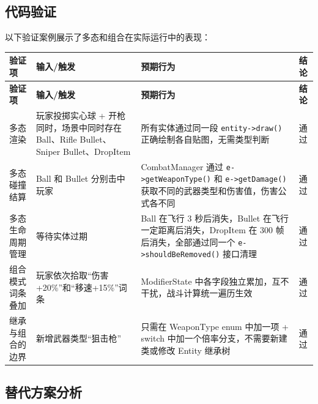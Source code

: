 \documentclass[utf8]{ctexart}
\begin{document}
\subsection{代码验证}

以下验证案例展示了多态和组合在实际运行中的表现：

\begin{longtable}{p{}p{}p{}p{}}
\toprule
\textbf{验证项} & \textbf{输入/触发} & \textbf{预期行为} & \textbf{结论} \\
\midrule
\endfirsthead
\toprule
\textbf{验证项} & \textbf{输入/触发} & \textbf{预期行为} & \textbf{结论} \\
\midrule
\endhead
多态渲染 & 玩家投掷实心球 + 开枪同时，场景中同时存在 Ball、Rifle Bullet、Sniper Bullet、DropItem & 所有实体通过同一段 \texttt{entity->draw()} 正确绘制各自贴图，无需类型判断 & 通过 \\
\hline
多态碰撞结算 & Ball 和 Bullet 分别击中玩家 & CombatManager 通过 \texttt{e->getWeaponType()} 和 \texttt{e->getDamage()} 获取不同的武器类型和伤害值，伤害公式各不同 & 通过 \\
\hline
多态生命周期管理 & 等待实体过期 & Ball 在飞行 3 秒后消失，Bullet 在飞行一定距离后消失，DropItem 在 300 帧后消失，全部通过同一个 \texttt{e->shouldBeRemoved()} 接口清理 & 通过 \\
\hline
组合模式词条叠加 & 玩家依次拾取“伤害+20\%”和“移速+15\%”词条 & ModifierState 中各字段独立累加，互不干扰，战斗计算统一遍历生效 & 通过 \\
\hline
继承与组合的边界 & 新增武器类型“狙击枪” & 只需在 WeaponType enum 中加一项 + switch 中加一个倍率分支，不需要新建类或修改 Entity 继承树 & 通过 \\
\bottomrule
\end{longtable}

\subsection{替代方案分析}
\end{document}

